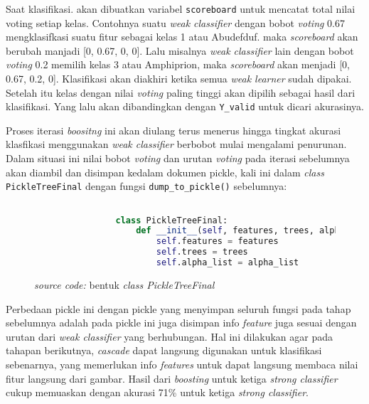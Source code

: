 		Saat klasifikasi. akan dibuatkan variabel \texttt{scoreboard} untuk mencatat total nilai voting 
		setiap kelas. Contohnya suatu \emph{weak classifier} dengan bobot \textit{voting} 0.67 
		mengklasifkasi suatu fitur sebagai kelas 1 atau Abudefduf. maka \emph{scoreboard} akan 
		berubah manjadi [0, 0.67, 0, 0]. Lalu misalnya \emph{weak classifier} lain dengan bobot 
		\textit{voting} 0.2 memilih kelas 3 atau Amphiprion, maka \emph{scoreboard} akan menjadi 
		[0, 0.67, 0.2, 0]. Klasifikasi akan diakhiri ketika semua \emph{weak learner} sudah 
		dipakai. Setelah itu kelas dengan nilai \textit{voting} paling tinggi akan dipilih sebagai 
		hasil dari klasifikasi. Yang lalu akan dibandingkan dengan \texttt{Y\_valid} untuk dicari akurasinya.

		Proses iterasi \emph{boositng} ini akan diulang terus menerus hingga tingkat akurasi klasfikasi 
		menggunakan \emph{weak classifier} berbobot mulai mengalami penurunan. Dalam situasi ini 
		nilai bobot \textit{voting} dan urutan \textit{voting} pada iterasi sebelumnya akan diambil dan disimpan 
		kedalam dokumen pickle, kali ini dalam \textit{class} \texttt{PickleTreeFinal} dengan fungsi 
		\texttt{dump\_to\_pickle()} sebelumnya:

		\begin{figure}[H]
			\begin{lstlisting}[language=Python, basicstyle=\tiny]

				class PickleTreeFinal:
					def __init__(self, features, trees, alpha_list):
						self.features = features
						self.trees = trees
						self.alpha_list = alpha_list

			\end{lstlisting}
			\caption{\emph{source code:} bentuk \textit{class PickleTreeFinal}}
			\label{code: PickleTreeFinal class}
		\end{figure}

		Perbedaan pickle ini dengan pickle yang menyimpan seluruh fungsi pada tahap sebelumnya 
		adalah pada pickle ini juga disimpan info \emph{feature} juga sesuai dengan urutan dari 
		\emph{weak classifier} yang berhubungan. Hal ini dilakukan agar pada tahapan berikutnya, 
		\emph{cascade} dapat langsung digunakan untuk klasifikasi sebenarnya, yang memerlukan info 
		\emph{features} untuk dapat langsung membaca nilai fitur langsung dari gambar. Hasil dari \emph{boosting} untuk ketiga \emph{strong classifier} cukup memuaskan 
		dengan akurasi 71\% untuk ketiga \emph{strong classifier}.
		
